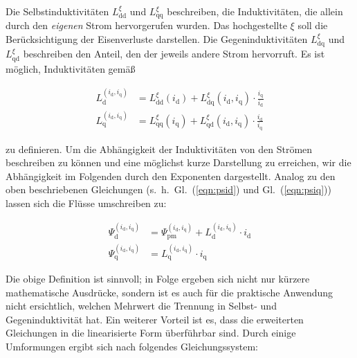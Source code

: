 \documentclass[conference,twocolumn]{IEEEtran}
\newcommand{\x}[1]{\mathrm{#1}}
\begin{document}
Die Selbstinduktivitäten $L_\x{dd}^{\xi}$ und $L_\x{qq}^{\xi}$ beschreiben, die Induktivitäten, die allein durch den \emph{eigenen} Strom hervorgerufen wurden.
Das hochgestellte $\xi$ soll die Berücksichtigung der Eisenverluste darstellen.
Die Gegeninduktivitäten $L_\x{dq}^{\xi}$ und $L_\x{qd}^{\xi}$ beschreiben den Anteil, den der jeweils andere Strom hervorruft.
Es ist möglich, Induktivitäten gemäß \textcite{Kellner2012}

\begin{align}
	L_\x{d}^{(i_\x{d},i_\x{q})}	&=	L_\x{dd}^{\xi}(i_\x{d})+L_\x{dq}^{\xi}(i_\x{d},i_\x{q})\cdot\frac{i_\x{q}}{i_\x{d}} \label{eqn:induktiv-neu-1} \\
	L_\x{q}^{(i_\x{d},i_\x{q})}	&=	L_\x{qq}^{\xi}(i_\x{q})+L_\x{qd}^{\xi}(i_\x{d},i_\x{q})\cdot\frac{i_\x{d}}{i_\x{q}} \label{eqn:induktiv-neu-2}
\end{align}

zu definieren.
Um die Abhängigkeit der Induktivitäten von den Strömen beschreiben zu können und eine möglichst kurze Darstellung zu erreichen, wir die Abhängigkeit im Folgenden durch den Exponenten dargestellt.
Analog zu den oben beschriebenen Gleichungen (s.~h.~Gl.~(\ref{eqn:psid}) und Gl.~(\ref{eqn:psiq})) lassen sich die Flüsse umschreiben zu:

\begin{align}
\Psi_\x{d}^{(i_\x{d},i_\x{q})} &= \Psi_\x{pm}^{(i_\x{d},i_\x{q})} + L_\x{d}^{(i_\x{d},i_\x{q})}\cdot i_\x{d} \\
\Psi_\x{q}^{(i_\x{d},i_\x{q})} &= L_\x{q}^{(i_\x{d},i_\x{q})}\cdot i_\x{q}
\end{align}

Die obige Definition ist sinnvoll; in Folge ergeben sich nicht nur kürzere mathematische Ausdrücke, sondern ist es auch für die praktische Anwendung nicht ersichtlich, welchen Mehrwert die Trennung in Selbst- und Gegeninduktivität hat.
Ein weiterer Vorteil ist es, dass die erweiterten Gleichungen in die linearisierte Form überführbar sind.
Durch einige Umformungen ergibt sich nach \textcite{Kellner2012} folgendes Gleichungssystem:
\end{document}
